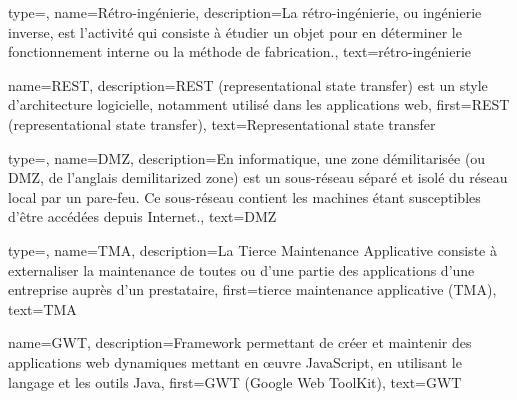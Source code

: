 





{
    type=\acronymtype,
    name={Rétro-ingénierie},
    description={La rétro-ingénierie, ou ingénierie inverse, est l'activité qui consiste à étudier un objet pour en déterminer le fonctionnement interne ou la méthode de fabrication.\cite{wiki:RetroIngenierie}},
    text={rétro-ingénierie}
}

{
    name={REST},
    description={REST (representational state transfer) est un style d'architecture logicielle, notamment utilisé dans les applications web\cite{wiki:REST}},
    first={REST (representational state transfer)},
    text={Representational state transfer}
}

{
    type=\acronymtype,
    name={DMZ},
    description={En informatique, une zone démilitarisée (ou DMZ, de l'anglais demilitarized zone) est un sous-réseau séparé et isolé du réseau local par un pare-feu. Ce sous-réseau contient les machines étant susceptibles d'être accédées depuis Internet.\cite{wiki:DMZ}},
    text={DMZ}
}

{
    type=\acronymtype,
    name={TMA},
    description={La Tierce Maintenance Applicative consiste à externaliser la maintenance de toutes ou d'une partie des applications d'une entreprise auprès d'un prestataire},
    first={tierce maintenance applicative (TMA)},
    text={TMA}
}

{
    name={GWT},
    description={Framework permettant de créer et maintenir des applications web dynamiques mettant en œuvre JavaScript, en utilisant le langage et les outils Java},
    first={GWT (Google Web ToolKit)},
    text={GWT}
}

